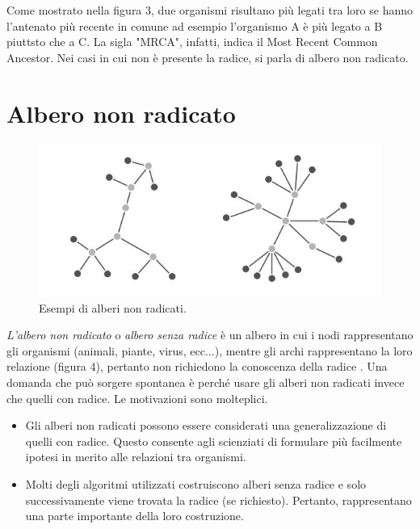 \newline
Come mostrato nella figura 3, due organismi risultano più legati tra loro se hanno l'antenato più recente in comune ad esempio l'organismo A è più legato a B piuttsto che a C. La sigla "MRCA", infatti, indica il Most Recent Common Ancestor.
\newline
Nei casi in cui non è presente la radice, si parla di albero non radicato.


\section{Albero non radicato}
\begin{figure}[h!]
	\includegraphics[width=\linewidth]{unrooted_trees.jpg}
 	\caption{Esempi di alberi non radicati.}
  	\label{fig:RootedTree}
\end{figure}
\textit{L'albero non radicato} o \textit{albero senza radice} è un albero in cui i nodi rappresentano gli organismi (animali, piante, virus, ecc...), mentre gli archi rappresentano la loro relazione (figura 4), pertanto non richiedono la conoscenza della radice \cite{bioinfalganactivelearningapproachparttwo}.
\newline
Una domanda che può sorgere spontanea è perché usare gli alberi non radicati invece che quelli con radice. Le motivazioni sono molteplici.
\begin{itemize}
	\item Gli alberi non radicati possono essere considerati una generalizzazione di quelli con radice. Questo consente agli scienziati di formulare più facilmente ipotesi in merito alle relazioni tra organismi.
	\item Molti degli algoritmi utilizzati costruiscono alberi senza radice e solo successivamente viene trovata la radice (se richiesto). Pertanto, rappresentano una parte importante della loro costruzione.
\end{itemize}



